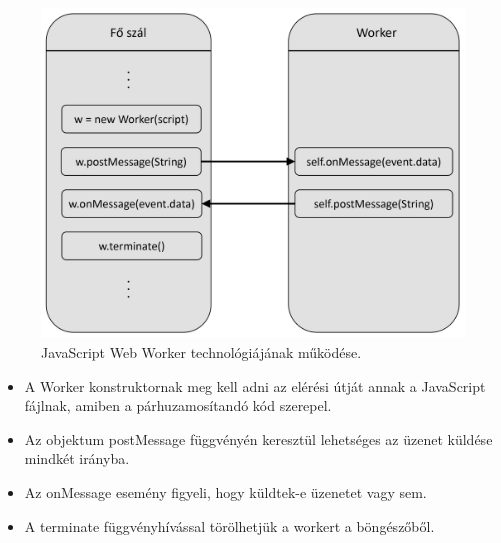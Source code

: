 \begin{figure}[ht]
\centering
\includegraphics[scale=0.6]{images/Worker.png}
\caption{JavaScript Web Worker technológiájának működése.}
\label{fig:jsww}
\end{figure}

\begin{itemize}
\item A Worker konstruktornak meg kell adni az elérési útját annak a JavaScript fájlnak, amiben a párhuzamosítandó kód szerepel.
\item Az objektum postMessage függvényén keresztül lehetséges az üzenet küldése mindkét irányba.
\item Az onMessage esemény figyeli, hogy küldtek-e üzenetet vagy sem.
\item A terminate függvényhívással törölhetjük a workert a böngészőből.
\end{itemize}
\newpage
{}

